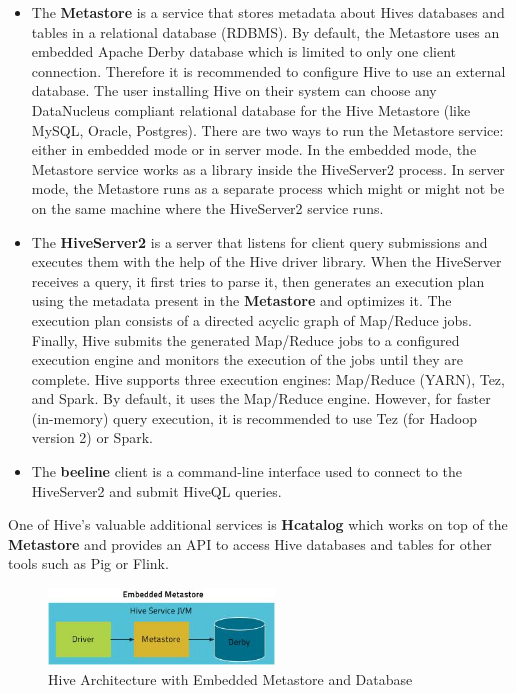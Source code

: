 \documentclass[12pt,english]{book}
\begin{document}
\begin{itemize}

\item
The \textbf{Metastore} is a service that stores metadata about Hives databases and tables in a relational database (RDBMS).
By default, the Metastore uses an embedded Apache Derby database
which is limited to only one client connection.
Therefore it is recommended to configure Hive to use an external database.
The user installing Hive on their system can choose any DataNucleus compliant relational database for the Hive Metastore (like MySQL, Oracle, Postgres).
There are two ways to run the Metastore service: either in embedded mode or in server mode.
In the embedded mode, the Metastore service works as a library inside the HiveServer2 process.
In server mode, the Metastore runs as a separate process which might or might not be on the same machine where the HiveServer2 service runs.

\item
The \textbf{HiveServer2} is a server that listens for client query submissions and executes them with the help of the Hive driver library.
When the HiveServer receives a query, it first tries to parse it, then generates an execution plan using the metadata present in the \textbf{Metastore} and optimizes it.
The execution plan consists of a directed acyclic graph of Map/Reduce jobs.
Finally, Hive submits the generated Map/Reduce jobs to a configured execution engine and monitors the execution of the jobs until they are complete.
Hive supports three execution engines: Map/Reduce (YARN), Tez, and Spark.
By default, it uses the Map/Reduce engine.
However, for faster (in-memory) query execution, it is recommended to use Tez (for Hadoop version 2) or Spark.

\item
The \textbf{beeline} client is a command-line interface used to connect to the HiveServer2 and submit HiveQL queries.

\end{itemize}

One of Hive's valuable additional services is \textbf{Hcatalog} which works on top of the \textbf{Metastore} and provides an API to access Hive databases and tables for other tools such as Pig or Flink.

\begin{figure}[H]
	\centering
	\includegraphics[width=6cm]{hiveEmbeddedMetaStore}
	\caption[Hive Architecture with Embedded Metastore and Database]{Hive Architecture with Embedded Metastore and Database\footnotemark}
\end{figure}
\end{document}
